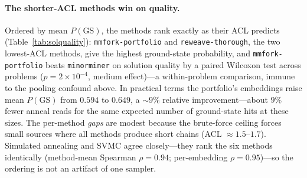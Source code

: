 \documentclass[acmsmall,anonymous,nonacm]{acmart}
\begin{document}
\paragraph{The shorter-ACL methods win on quality.} Ordered by mean
$P(\mathrm{GS})$, the methods rank exactly as their ACL predicts
(Table~\ref{tab:solquality}): \texttt{mmfork-portfolio} and \texttt{reweave-thorough},
the two lowest-ACL methods, give the highest ground-state probability, and
\texttt{mmfork-portfolio} beats \texttt{minorminer} on solution quality by a paired
Wilcoxon test across problems ($p=2\times10^{-4}$, medium effect)---a within-problem
comparison, immune to the pooling confound above. In practical terms the portfolio's
embeddings raise mean $P(\mathrm{GS})$ from $0.594$ to $0.649$, a ${\sim}9\%$
relative improvement---about $9\%$ fewer anneal reads for the same expected number
of ground-state hits at these sizes. The per-method
\emph{gaps} are modest because the brute-force ceiling forces small sources where
all methods produce short chains (ACL ${\approx}1.5$--$1.7$).
Simulated annealing and SVMC agree closely---they rank the six methods identically
(method-mean Spearman $\rho=0.94$; per-embedding $\rho=0.95$)---so the ordering is not
an artifact of one sampler.

\begin{table}[t]
\caption{Solution quality by method (mean over the $114$ problems, reference chain
strength, clean and broken $P_3$). Lower ACL tracks higher ground-state probability
under both samplers, lower residual energy, and fewer chain breaks.
$^{***}$\,$p<10^{-3}$, paired Wilcoxon vs.\ \texttt{minorminer}.}
\label{tab:solquality}
\small
\centering

\end{table}
\end{document}
